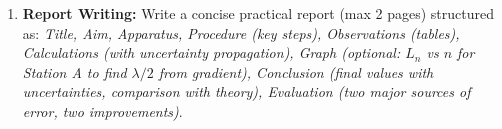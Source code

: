 \documentclass[11pt]{article}
\begin{document}
\begin{enumerate}
\begin{enumerate}
        \item \textbf{Stationary Wave Check:} For the resonance tube at Station A, the first resonance length $L_1$ corresponds to a stationary wave pattern. Draw the displacement wave profile inside the tube at resonance, labelling the node (N) at the water surface, the antinode (A) near the open end, and indicating the distance $L_1 + e = \lambda/4$. What is the phase difference between the motion of air particles at the node and at the antinode?
    \end{enumerate}
    \item \textbf{Report Writing:} Write a concise practical report (max 2 pages) structured as: \emph{Title, Aim, Apparatus, Procedure (key steps), Observations (tables), Calculations (with uncertainty propagation), Graph (optional: $L_n$ vs $n$ for Station A to find $\lambda/2$ from gradient), Conclusion (final values with uncertainties, comparison with theory), Evaluation (two major sources of error, two improvements)}.
\end{enumerate}
\end{document}
